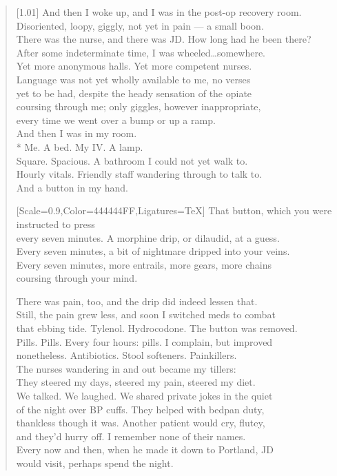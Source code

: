 \begin{verse}[1.01\textwidth]
  And then I woke up, and I was in the post-op recovery room.\\
  Disoriented, loopy, giggly, not yet in pain --- a small boon.\\
  There was the nurse, and there was JD. How long had he been there?\\
  After some indeterminate time, I was wheeled\ldots{}somewhere.\\
  Yet more anonymous halls. Yet more competent nurses.\\
  Language was not yet wholly available to me, no verses\\
  yet to be had, despite the heady sensation of the opiate\\
  coursing through me; only giggles, however inappropriate,\\
  every time we went over a bump or up a ramp.\\
  And then I was in my room.\\*
   Me. A bed. My IV. A lamp.\\
  Square. Spacious. A bathroom I could not yet walk to.\\
  Hourly vitals. Friendly staff wandering through to talk to.\\
  And a button in my hand.

  {[Scale=0.9,Color=444444FF,Ligatures=TeX]
  \vin That button, which you were instructed to press\\
  \vin every seven minutes. A morphine drip, or dilaudid, at a guess.\\
  \vin Every seven minutes, a bit of nightmare dripped into your veins.\\
  \vin Every seven minutes, more entrails, more gears, more chains\\
  \vin coursing through your mind.}

  There was pain, too, and the drip did indeed lessen that.\\
  Still, the pain grew less, and soon I switched meds to combat\\
  that ebbing tide. Tylenol. Hydrocodone. The button was removed.\\
  Pills. Pills. Every four hours: pills. I complain, but improved\\
  nonetheless. Antibiotics. Stool softeners. Painkillers.\\
  The nurses wandering in and out became my tillers:\\
  They steered my days, steered my pain, steered my diet.\\\newpage
  We talked. We laughed. We shared private jokes in the quiet\\
  of the night over BP cuffs. They helped with bedpan duty,\\
  thankless though it was. Another patient would cry, flutey,\\
  and they'd hurry off. I remember none of their names.\\
  Every now and then, when he made it down to Portland, JD\\
  would visit, perhaps spend the night.


\end{verse}
